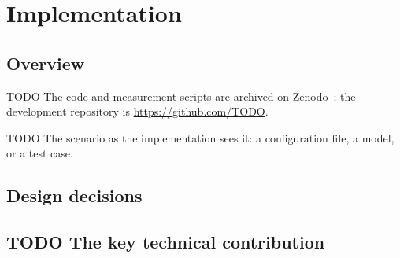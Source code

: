 \chapter{Implementation}\label{ch:implementation}

\section{Overview}
TODO The code and measurement scripts are archived on Zenodo~\cite{artifact}; the development repository is \url{https://github.com/TODO}.
\begin{runningexample}[as input]
TODO The scenario as the implementation sees it: a configuration file, a model, or a test case.
\end{runningexample}

\section{Design decisions}

\section{TODO The key technical contribution}
